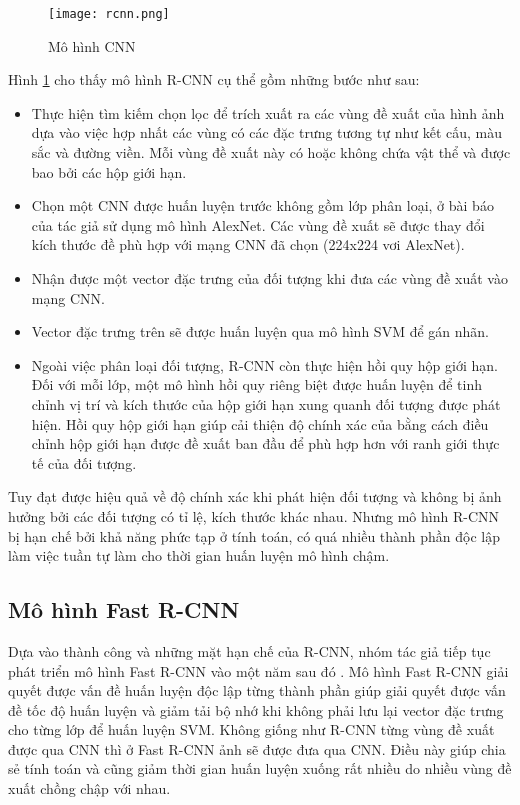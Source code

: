 \documentclass[../the.tex]{subfiles}
\begin{document}
\begin{figure}[H]
	\centering
	\texttt{[image: rcnn.png]}
	\caption{Mô hình CNN \cite{girshick2014rich}}
	\label{fig:rcnn}
\end{figure}

{\fontsize{13}{12} \selectfont

Hình \ref{fig:rcnn} cho thấy mô hình R-CNN cụ thể gồm những bước như sau:

\begin{itemize}
	\item Thực hiện tìm kiếm chọn lọc để trích xuất ra các vùng đề xuất của hình ảnh dựa vào việc hợp nhất các vùng có các đặc trưng tương tự như kết cấu, màu sắc và đường viền. Mỗi vùng đề xuất này có hoặc không chứa vật thể và được bao bởi các hộp giới hạn.
	\item Chọn một CNN được huấn luyện trước không gồm lớp phân loại, ở bài báo của tác giả sử dụng mô hình AlexNet. Các vùng đề xuất sẽ được thay đổi kích thước đề phù hợp với mạng CNN đã chọn (224x224 vơi AlexNet).
	\item Nhận được một vector đặc trưng của đối tượng khi đưa các vùng đề xuất vào mạng CNN.
	\item Vector đặc trưng trên sẽ được huấn luyện qua mô hình SVM để gán nhãn.
	\item Ngoài việc phân loại đối tượng, R-CNN còn thực hiện hồi quy hộp giới hạn. Đối với mỗi lớp, một mô hình hồi quy riêng biệt được huấn luyện để tinh chỉnh vị trí và kích thước của hộp giới hạn xung quanh đối tượng được phát hiện. Hồi quy hộp giới hạn giúp cải thiện độ chính xác của bằng cách điều chỉnh hộp giới hạn được đề xuất ban đầu để phù hợp hơn với ranh giới thực tế của đối tượng.
\end{itemize}

}

{\fontsize{13}{12} \selectfont

Tuy đạt được hiệu quả về độ chính xác khi phát hiện đối tượng và không bị ảnh hưởng bởi các đối tượng có tỉ lệ, kích thước khác nhau.
Nhưng mô hình R-CNN bị hạn chế bởi khả năng phức tạp ở tính toán, có quá nhiều thành phần độc lập làm việc tuần tự làm cho thời gian huấn luyện mô hình chậm.

}

\subsection{Mô hình Fast R-CNN}

{\fontsize{13}{12} \selectfont

	Dựa vào thành công và những mặt hạn chế của R-CNN, nhóm tác giả tiếp tục phát triển mô hình Fast R-CNN vào một năm sau đó \cite{girshick2015fast}.
	Mô hình Fast R-CNN giải quyết được vấn đề huấn luyện độc lập từng thành phần giúp giải quyết được vấn đề tốc độ huấn luyện và giảm tải bộ nhớ khi không phải lưu lại vector đặc trưng cho từng lớp để huấn luyện SVM.
	Không giống như R-CNN từng vùng đề xuất được qua CNN thì ở Fast R-CNN ảnh sẽ được đưa qua CNN. Điều này giúp chia sẻ tính toán và cũng giảm thời gian huấn luyện xuống rất nhiều do nhiều vùng đề xuất chồng chập với nhau.

}
\end{document}
